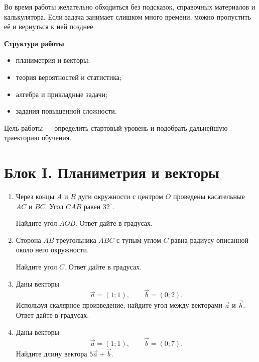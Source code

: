 \documentclass[a4paper,12pt]{article}
\newcommand{\taskspace}{\par\vspace{0.55cm}}
\begin{document}
Во время работы желательно обходиться без подсказок, справочных материалов
и калькулятора. Если задача занимает слишком много времени, можно пропустить
её и вернуться к ней позднее.

\vspace{8mm}

{\large\bfseries\color{accent}
Структура работы}

\begin{itemize}[
  leftmargin=7mm,
  itemsep=0.45em
]
  \item планиметрия и векторы;
  \item теория вероятностей и статистика;
  \item алгебра и прикладные задачи;
  \item задания повышенной сложности.
\end{itemize}

\vfill

{\small\color{soft}
Цель работы --- определить стартовый уровень и подобрать дальнейшую
траекторию обучения.}

\newpage


\section*{Блок I. Планиметрия и векторы}

\begin{enumerate}

\item Через концы $A$ и $B$ дуги окружности с центром $O$ проведены
касательные $AC$ и $BC$. Угол $CAB$ равен $32^\circ$.

Найдите угол $AOB$. Ответ дайте в градусах.
\taskspace

\item Сторона $AB$ треугольника $ABC$ с тупым углом $C$ равна радиусу
описанной около него окружности.

Найдите угол $C$. Ответ дайте в градусах.
\taskspace

\item Даны векторы
\[
\vec a=(1;1),
\qquad
\vec b=(0;2).
\]
Используя скалярное произведение, найдите угол между векторами
$\vec a$ и $\vec b$. Ответ дайте в градусах.
\taskspace

\item Даны векторы
\[
\vec a=(1;1),
\qquad
\vec b=(0;7).
\]
Найдите длину вектора $5\vec a+\vec b$.
\taskspace

\end{enumerate}
\end{document}
